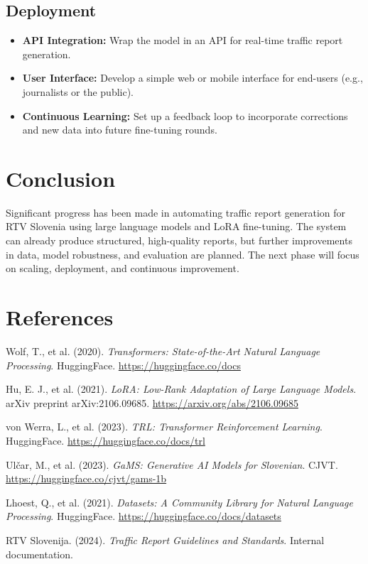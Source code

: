 \documentclass[fleqn,moreauthors,10pt]{ds_report}
\begin{document}
\subsection*{Deployment}
\begin{itemize}
    \item \textbf{API Integration:} Wrap the model in an API for real-time traffic report generation.
    \item \textbf{User Interface:} Develop a simple web or mobile interface for end-users (e.g., journalists or the public).
    \item \textbf{Continuous Learning:} Set up a feedback loop to incorporate corrections and new data into future fine-tuning rounds.
\end{itemize}

\section*{Conclusion}
Significant progress has been made in automating traffic report generation for RTV Slovenia using large language models and LoRA fine-tuning. The system can already produce structured, high-quality reports, but further improvements in data, model robustness, and evaluation are planned. The next phase will focus on scaling, deployment, and continuous improvement.
\section*{References}

\begin{thebibliography}{9}

Wolf, T., et al. (2020).
\textit{Transformers: State-of-the-Art Natural Language Processing}.
HuggingFace.
\url{https://huggingface.co/docs}

Hu, E. J., et al. (2021).
\textit{LoRA: Low-Rank Adaptation of Large Language Models}.
arXiv preprint arXiv:2106.09685.
\url{https://arxiv.org/abs/2106.09685}

von Werra, L., et al. (2023).
\textit{TRL: Transformer Reinforcement Learning}.
HuggingFace.
\url{https://huggingface.co/docs/trl}

Ulčar, M., et al. (2023).
\textit{GaMS: Generative AI Models for Slovenian}.
CJVT.
\url{https://huggingface.co/cjvt/gams-1b}

Lhoest, Q., et al. (2021).
\textit{Datasets: A Community Library for Natural Language Processing}.
HuggingFace.
\url{https://huggingface.co/docs/datasets}

RTV Slovenija. (2024).
\textit{Traffic Report Guidelines and Standards}.
Internal documentation.

\end{thebibliography}
\end{document}
